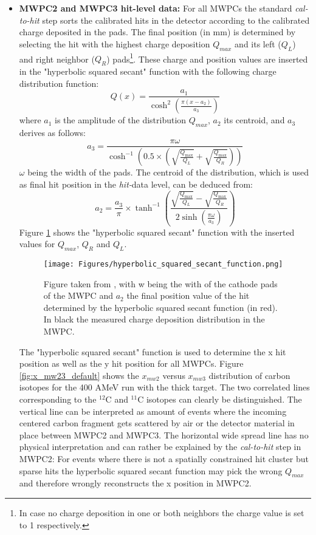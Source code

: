 \begin{itemize}
\itemsep0em
\item \textbf{MWPC2 and MWPC3 hit-level data:}\newline
For all MWPCs the standard  \textit{cal-to-hit} step  sorts the calibrated hits in the detector according to the calibrated charge deposited in the pads. The final position (in mm) is determined by selecting the hit with the highest charge deposition $Q_{max}$ and its left ($Q_L$) and right neighbor ($Q_R$) pads\footnote{In case no charge deposition in one or both neighbors the charge value is set to 1 respectively.}. These charge and position values are inserted in the "hyperbolic squared secant" function \cite{lau1995optimization} with the following charge distribution function:
\[
Q(x) = \frac{a_1}{\cosh^2\left(\frac{\pi (x - a_2)}{a_3}\right)}
\]
\vspace{-0.5em} %
where \(a_1\) is the amplitude of the distribution $Q_{max}$, \(a_2\) its centroid, and \(a_3\) derives as follows:
\[
a_3 = \frac{\pi \omega}{\cosh^{-1}\left(0.5 \times \left(\sqrt{\frac{Q_{\text{max}}}{Q_L}} + \sqrt{\frac{Q_{\text{max}}}{Q_R}}\right)\right)}
\]
\vspace{-0.5em} %
\(\omega\) being the width of the pads. The centroid of the distribution, which is used as final hit position in the \textit{hit-}data level, can be deduced from:
\vspace{-0.5em} %
\[
a_2 = \frac{a_3}{\pi} \times \tanh^{-1}\left(\frac{\sqrt{\frac{Q_{\text{max}}}{Q_L}} - \sqrt{\frac{Q_{\text{max}}}{Q_R}}}{2 \sinh\left(\frac{\pi \omega}{a_3}\right)}\right)
\]
Figure \ref{fig:hyp_function} shows the "hyperbolic squared secant" function with the inserted values for $Q_{max}$, $Q_R$ and $Q_L$. 
\begin{figure}[htpb]
    \centering
    \texttt{[image: Figures/hyperbolic\_squared\_secant\_function.png]}
    \caption{
   	 Figure taken from \cite{martin2021fission}, with w being the with of the cathode pads of the MWPC and $a_2$ the final position value of the hit determined by the hyperbolic squared secant function (in red). In black the measured charge deposition distribution in the MWPC. 
     }
    \label{fig:hyp_function}
\end{figure}
The "hyperbolic squared secant" function is used to determine the x hit position as well as the y hit position for all MWPCs. Figure \ref{fig:x_mw23_default} shows the $x_{mw2}$ versus $x_{mw3}$ distribution of carbon isotopes for the 400 AMeV run with the thick target. The two correlated lines corresponding to the $^{12}$C and $^{11}$C isotopes can clearly be distinguished. The vertical line can be interpreted as amount of events where the incoming centered carbon fragment gets scattered by air or the detector material in place between MWPC2 and MWPC3. The horizontal wide spread line has no physical interpretation and can rather be explained by the \textit{cal-to-hit} step in MWPC2: For events where there is not a spatially constrained hit cluster but sparse hits the hyperbolic squared secant function may pick the wrong $Q_{max}$ and therefore wrongly reconstructs the x position in MWPC2. 

\end{itemize}
